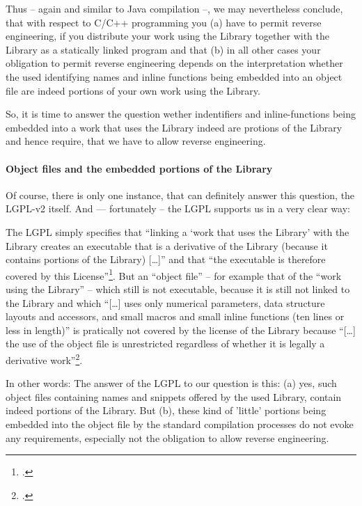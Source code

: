 Thus -- again and similar to Java compilation --, we may nevertheless conclude,
that with respect to C/C++ programming you (a) have to permit reverse
engineering, if you distribute your work using the Library together with the
Library as a statically linked program and that (b) in all other cases your
obligation to permit reverse engineering depends on the interpretation whether
the used identifying names and inline functions being embedded into an object
file are indeed portions of your own work using the Library. 

So, it is time to answer the question wether indentifiers and inline-functions
being embedded into a work that uses the Library indeed are protions of the
Library and hence require, that we have to allow reverse engineering.

\paragraph{Object files and the embedded portions of the Library}

Of course, there is only one instance, that can definitely answer this question,
the LGPL-v2 itself. And --- fortunately -- the LGPL supports us in a very clear
way:

The LGPL simply specifies that \enquote{linking a \enquote{work that uses the
Library} with the Library creates an executable that is a derivative of the
Library (because it contains portions of the Library) [\ldots]} and that
\enquote{the executable is therefore covered by this
License}\footcite[cf.][\nopage wp. §5]{Lgpl21OsiLicense199a}. But an
\enquote{object file} -- for example that of the \enquote{work using the
Library} -- which still is not executable, because it is still not linked to the
Library and which \enquote{[\ldots] uses only numerical parameters, data
structure layouts and accessors, and small macros and small inline functions
(ten lines or less in length)} is pratically not covered by the license of the
Library because \enquote{[\ldots] the use of the object file is unrestricted
regardless of whether it is legally a derivative work}\footcite[cf.][\nopage wp.
§5]{Lgpl21OsiLicense199a}.

In other words: The answer of the LGPL to our question is this: (a) yes, such
object files containing names and snippets offered by the used Library, contain
indeed portions of the Library. But (b), these kind of 'little' portions being
embedded into the object file by the standard compilation processes do not evoke
any requirements, especially not the obligation to allow reverse engineering.



